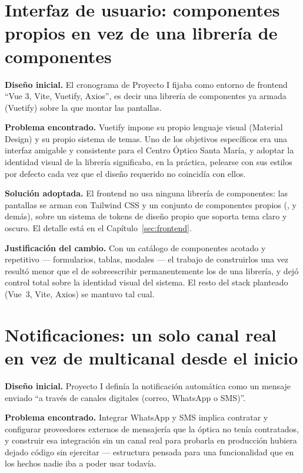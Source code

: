 \section{Interfaz de usuario: componentes propios en vez de una librería de componentes}
\label{sec:cambios-ui}

\textbf{Diseño inicial.} El cronograma de Proyecto I fijaba como entorno de frontend ``Vue 3, Vite, Vuetify, Axios'', es decir una librería de componentes ya armada (Vuetify) sobre la que montar las pantallas.

\textbf{Problema encontrado.} Vuetify impone su propio lenguaje visual (Material Design) y su propio sistema de temas. Uno de los objetivos específicos era una interfaz amigable y consistente para el Centro Óptico Santa María, y adoptar la identidad visual de la librería significaba, en la práctica, pelearse con sus estilos por defecto cada vez que el diseño requerido no coincidía con ellos.

\textbf{Solución adoptada.} El frontend no usa ninguna librería de componentes: las pantallas se arman con Tailwind CSS y un conjunto de componentes propios (,  y demás), sobre un sistema de tokens de diseño propio que soporta tema claro y oscuro. El detalle está en el Capítulo~\ref{sec:frontend}.

\textbf{Justificación del cambio.} Con un catálogo de componentes acotado y repetitivo --- formularios, tablas, modales --- el trabajo de construirlos una vez resultó menor que el de sobreescribir permanentemente los de una librería, y dejó control total sobre la identidad visual del sistema. El resto del stack planteado (Vue~3, Vite, Axios) se mantuvo tal cual.

\section{Notificaciones: un solo canal real en vez de multicanal desde el inicio}
\label{sec:cambios-notificaciones}

\textbf{Diseño inicial.} Proyecto I definía la notificación automática como un mensaje enviado ``a través de canales digitales (correo, WhatsApp o SMS)''.

\textbf{Problema encontrado.} Integrar WhatsApp y SMS implica contratar y configurar proveedores externos de mensajería que la óptica no tenía contratados, y construir esa integración sin un canal real para probarla en producción hubiera dejado código sin ejercitar --- estructura pensada para una funcionalidad que en los hechos nadie iba a poder usar todavía.

